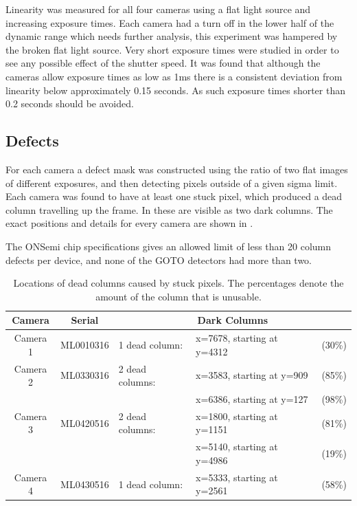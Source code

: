 \begin{colsection}
\begin{colsection}
Linearity was measured for all four cameras using a flat light source and increasing exposure times. Each camera had a turn off in the lower half of the dynamic range which needs further analysis, this experiment was hampered by the broken flat light source. Very short exposure times were studied in order to see any possible effect of the shutter speed. It was found that although the cameras allow exposure times as low as 1ms there is a consistent deviation from linearity below approximately 0.15 seconds. As such exposure times shorter than 0.2 seconds should be avoided.

\end{colsection}

\newpage
\subsection{Defects}
\label{sec:defects}
\begin{colsection}


For each camera a defect mask was constructed using the ratio of two flat images of different exposures, and then detecting pixels outside of a given sigma limit. Each camera was found to have at least one stuck pixel, which produced a dead column travelling up the frame. In  these are visible as two dark columns. The exact positions and details for every camera are shown in .

The ONSemi chip specifications gives an allowed limit of less than 20 column defects per device, and none of the GOTO detectors had more than two.



\begin{table}[t]
    \begin{center}
        \begin{tabular}{cc|lll} %
            Camera   & Serial    & \multicolumn{3}{c}{Dark Columns} \\
            \midrule
            Camera 1 & ML0010316 & 1 dead column:  & x=7678, starting at y=4312 & (30\%) \\
            Camera 2 & ML0330316 & 2 dead columns: & x=3583, starting at y=909  & (85\%) \\
                     &           &                 & x=6386, starting at y=127  & (98\%) \\
            Camera 3 & ML0420516 & 2 dead columns: & x=1800, starting at y=1151 & (81\%) \\
                     &           &                 & x=5140, starting at y=4986 & (19\%) \\
            Camera 4 & ML0430516 & 1 dead column:  & x=5333, starting at y=2561 & (58\%) \\
        \end{tabular}
    \end{center}
    \caption[TODO]{
        Locations of dead columns caused by stuck pixels. The percentages denote the amount of the column that is unusable.
    }\label{tab:frame}
\end{table}


\end{colsection}
\end{colsection}
